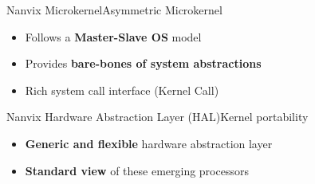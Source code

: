 		\begin{frame}[fragile]{Nanvix Microkernel}{Asymmetric Microkernel}

			\begin{itemize}
				\item Follows a \textbf{Master-Slave OS} model
				\item Provides \textbf{bare-bones of system abstractions}
				\item Rich system call interface (Kernel Call)
			\end{itemize}


		\end{frame}

		\begin{frame}[fragile]{Nanvix Hardware Abstraction Layer (HAL)}{Kernel portability}

			\begin{itemize}
				\item \textbf{Generic and flexible} hardware abstraction layer
				\item \textbf{Standard view} of these emerging processors
			\end{itemize}


		\end{frame}

